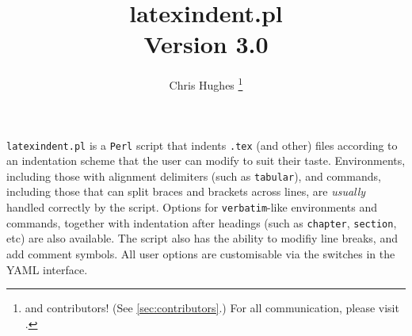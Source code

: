 \documentclass[10pt]{article}
\begin{document}
\title{\ttfamily\bfseries latexindent.pl\\[1cm] Version 3.0}
\author{Chris Hughes \footnote{and contributors! (See \vref{sec:contributors}.) For
		all communication, please visit \cite{latexindent-home}.}}
\maketitle
\begin{adjustwidth}{1cm}{1cm}
  \small
	\texttt{latexindent.pl} is a \texttt{Perl} script that indents \texttt{.tex} (and other)
	files according to an indentation scheme that the user can modify to suit their
	taste. Environments, including those with alignment delimiters (such as \texttt{tabular}),
	and commands, including those that can split braces and brackets across lines,
	are \emph{usually} handled correctly by the script. Options for \texttt{verbatim}-like
	environments and commands, together with indentation after headings (such as \lstinline!chapter!, \lstinline!section!, etc)
	are also available. The script also has the ability to modifiy line breaks, and add
	comment symbols. All user options are customisable via the switches in the YAML interface.
\end{adjustwidth}
\tableofcontents
{\small
	\lstlistoflistings
}

%
%
%
%

%
%
%
%
%
%
%
%
%
%
\end{document}
